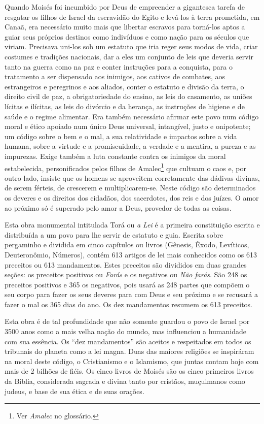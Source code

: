 Quando Moisés foi incumbido por Deus de empreender a gigantesca tarefa de resgatar os filhos de Israel da escravidão do Egito e levá-los à terra prometida, em Canaã, era necessário muito mais que libertar escravos para torná-los aptos a guiar seus próprios destinos como indivíduos e como nação para os séculos que viriam. Precisava uni-los sob um estatuto que iria reger seus modos de vida, criar costumes e tradições nacionais, dar a eles um conjunto de leis que deveria servir tanto na guerra como na paz e conter instruções para a conquista, para o tratamento a ser dispensado aos inimigos, aos cativos de combates, aos estrangeiros e peregrinos e aos aliados, conter o estatuto e divisão da terra, o direito civil de paz, a obrigatoriedade do ensino, as leis do casamento, as uniões lícitas e ilícitas, as leis do divórcio e da herança, as instruções de higiene e de saúde e o regime alimentar. Era também necessário afirmar este povo num código moral e ético apoiado num único Deus universal, intangível, justo e onipotente; um código sobre o bem e o mal, a sua relatividade e impactos sobre a vida humana, sobre a virtude e a promiscuidade, a verdade e a mentira, a pureza e as impurezas. Exige também a luta constante contra os inimigos da moral estabelecida, personificados pelos filhos de Amalec\footnote{Ver \emph{Amalec} no glossário.} que cultuam o caos e, por outro lado, insiste que os homens se aproveitem corretamente das dádivas divinas, de serem férteis, de crescerem e multiplicarem-se. Neste código são determinados os deveres e os direitos dos cidadãos, dos sacerdotes, dos reis e dos juízes. O amor ao próximo só é superado pelo amor a Deus, provedor de todas as coisas.

Esta obra monumental intitulada Torá ou \emph{a Lei} é a
primeira constituição escrita e distribuída a um povo para lhe servir
de estatuto e guia. Escrita sobre pergaminho e dividida em cinco capítulos
ou livros (Gênesis, Êxodo, Levíticos, Deuteronômio, Números), contém 613
artigos de lei mais conhecidos como os 613 preceitos ou 613 mandamentos.
Estes preceitos são divididos em duas grandes seções: os preceitos
positivos ou \emph{Farás} e os negativos ou \emph{Não farás}. São 248 os
preceitos positivos e 365 os negativos, pois usará as 248 partes que
compõem o seu corpo para fazer os seus deveres para com Deus e seu
próximo e se recusará a fazer o mal os 365 dias do ano. Os dez
mandamentos resumem os 613 preceitos.

Esta obra é de tal profundidade que não somente guardou o povo de Israel
por 3500 anos como a mais velha nação do mundo, mas influenciou a
humanidade com sua essência. Os ``dez mandamentos'' são aceitos e
respeitados em todos os tribunais do planeta como a lei magna. Duas das
maiores religiões se inspiráram na moral deste código, o Cristianismo e
o Islamismo, que juntas contam hoje com mais de 2 bilhões de fiéis. Os
cinco livros de Moisés são os cinco primeiros livros da Bíblia,
considerada sagrada e divina tanto por cristãos, muçulmanos como judeus,
e base de sua ética e de suas orações.

